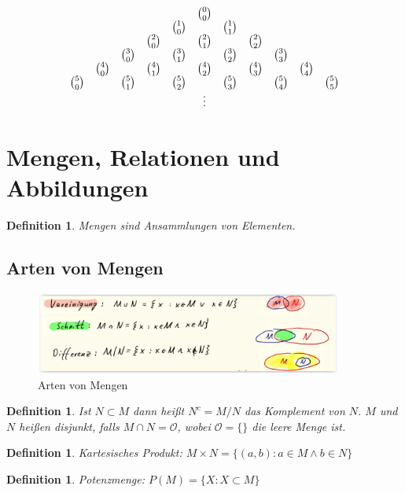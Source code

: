 \documentclass[12pt,a4paper]{article}%
\newtheorem{definition}[satz]{Definition}
\numberwithin{equation}{section}
\numberwithin{equation}{subsection}
\begin{document}
  \begin{align}
    \begin{array}{c c c c c c c c c c c}
      \; & \; &  \; & \; & \; &  \binom{0}{0} & \; & \; & \; & \; & \;\\
      \; & \; &  \; & \; & \binom{1}{0}  & \; &  \binom{1}{1} & \; & \; & \; & \;\\
      \; & \; &  \; & \binom{2}{0}  & \; & \binom{2}{1}  & \; & \binom{2}{2}  & \; & \; & \;\\
      \; & \; &  \binom{3}{0}  & \; & \binom{3}{1}  & \; & \binom{3}{2}  & \; & \binom{3}{3}  & \; & \;\\
      \; & \binom{4}{0}  &  \; & \binom{4}{1}  & \; &  \binom{4}{2} & \; & \binom{4}{3}  & \; & \binom{4}{4}  & \;\\
      \binom{5}{0}  & \; &  \binom{5}{1}  & \; & \binom{5}{2} & \; & \binom{5}{3} & \; & \binom{5}{4}  & \; & \binom{5}{5} \\
      \; & \; &  \; & \; & \; &\vdots& \; & \; & \; & \; & \;\\
    \end{array}
  \end{align}
  \newpage
  
\section{Mengen, Relationen und Abbildungen}
  \begin{definition}
    Mengen sind Ansammlungen von Elementen.
  \end{definition}
  \subsection{Arten von Mengen}
	  \begin{figure}[htbp] 
		  \centering
		  \includegraphics[width=0.9\textwidth]{mengen_arten.png}
		  \caption{Arten von Mengen\protect\cite{HM12}}
		  \label{fig:mengen_arten}
		\end{figure}
	  \begin{definition}
	    Ist $N \subset M$ dann heißt $N^c = M/N$ das Komplement von $N$. $M$ und $N$ heißen disjunkt, falls $M \cap N = \mathcal{O}$, wobei $\mathcal{O} = \lbrace \rbrace$ die leere Menge ist.
	  \end{definition}
	  \begin{definition}
	    Kartesisches Produkt: $M \times N = \lbrace (a,b): a \in M \land b \in N\rbrace$
	  \end{definition}
	  \begin{definition}
	    Potenzmenge: $P(M) = \lbrace X:X\subset M\rbrace$
	  \end{definition}
\end{document}
